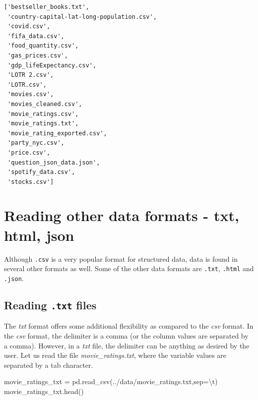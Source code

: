\documentclass[
  letterpaper,
  DIV=11,
  numbers=noendperiod]{scrreprt}
\newenvironment{Shaded}{\begin{snugshade}}{\end{snugshade}}
\newcommand{\CharTok}[1]{\textcolor[rgb]{0.13,0.47,0.30}{#1}}
\newcommand{\NormalTok}[1]{\textcolor[rgb]{0.00,0.23,0.31}{#1}}
\newcommand{\OperatorTok}[1]{\textcolor[rgb]{0.37,0.37,0.37}{#1}}
\newcommand{\StringTok}[1]{\textcolor[rgb]{0.13,0.47,0.30}{#1}}
\begin{document}
\begin{verbatim}
['bestseller_books.txt',
 'country-capital-lat-long-population.csv',
 'covid.csv',
 'fifa_data.csv',
 'food_quantity.csv',
 'gas_prices.csv',
 'gdp_lifeExpectancy.csv',
 'LOTR 2.csv',
 'LOTR.csv',
 'movies.csv',
 'movies_cleaned.csv',
 'movie_ratings.csv',
 'movie_ratings.txt',
 'movie_rating_exported.csv',
 'party_nyc.csv',
 'price.csv',
 'question_json_data.json',
 'spotify_data.csv',
 'stocks.csv']
\end{verbatim}

\hypertarget{reading-other-data-formats---txt-html-json}{%
\section{Reading other data formats - txt, html,
json}\label{reading-other-data-formats---txt-html-json}}

Although \texttt{.csv} is a very popular format for structured data,
data is found in several other formats as well. Some of the other data
formats are \texttt{.txt}, \texttt{.html} and \texttt{.json}.

\hypertarget{reading-.txt-files}{%
\subsection{\texorpdfstring{Reading \texttt{.txt}
files}{Reading .txt files}}\label{reading-.txt-files}}

The \emph{txt} format offers some additional flexibility as compared to
the \emph{csv} format. In the \emph{csv} format, the delimiter is a
comma (or the column values are separated by a comma). However, in a
\emph{txt} file, the delimiter can be anything as desired by the user.
Let us read the file \emph{movie\_ratings.txt}, where the variable
values are separated by a tab character.

\begin{Shaded}
\begin{Highlighting}[]
\NormalTok{movie\_ratings\_txt }\OperatorTok{=}\NormalTok{ pd.read\_csv(}\StringTok{\textquotesingle{}../data/movie\_ratings.txt\textquotesingle{}}\NormalTok{,sep}\OperatorTok{=}\StringTok{\textquotesingle{}}\CharTok{\textbackslash{}t}\StringTok{\textquotesingle{}}\NormalTok{)}
\NormalTok{movie\_ratings\_txt.head()}
\end{Highlighting}
\end{Shaded}
\end{document}
